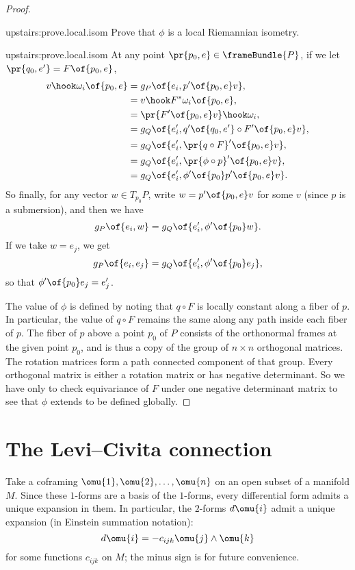 \begin{proof}
\begin{problem}{upstairs:prove.local.isom}
Prove that \(\phi\) is a local Riemannian isometry.
\end{problem}
\begin{answer}{upstairs:prove.local.isom}
At any point \(\pr{p_0,e} \in \frameBundle{P}\), if we let \(\pr{q_0,e'}=F\of{p_0,e}\),
\begin{align*}
v \hook \omega_i\of{p_0,e}
&=
g_P\of{e_i, p'\of{p_0,e}v},
\\
&=
v \hook F^* \omega_i \of{p_0,e},
\\
&=
\pr{F'\of{p_0,e}v} \hook \omega_i,
\\
&=
g_Q\of{e'_i,q'\of{q_0,e'} \circ F'\of{p_0,e}v},
\\
&=
g_Q\of{e'_i,\pr{q \circ F}'\of{p_0,e}v},
\\
&=
g_Q\of{e'_i,\pr{\phi \circ p}'\of{p_0,e}v},
\\
&=
g_Q\of{e'_i,\phi'\of{p_0} p'\of{p_0,e}v}.
\end{align*}
So finally, for any vector \(w \in T_{p_0} P\), write \(w=p'\of{p_0,e}v\) for some \(v\) (since \(p\) is a submersion), and then we have
\[
g_P\of{e_i,w}=g_Q\of{e_i',\phi'\of{p_0}w}.
\]
If we take \(w=e_j\), we get
\[
g_P\of{e_i,e_j}=g_Q\of{e_i',\phi'\of{p_0}e_j},
\]
so that \(\phi'\of{p_0}e_j = e_j'\).
\end{answer}
The value of \(\phi\) is defined by noting that \(q \circ F\) is locally constant along a fiber of \(p\).
In particular, the value of \(q \circ F\) remains the same along any path inside each fiber of \(p\).
The fiber of \(p\) above a point \(p_0\) of \(P\) consists of the orthonormal frames at the given point \(p_0\), and is thus a copy of the group of \(n \times n\) orthogonal matrices.
The rotation matrices form a path connected component of that group.
Every orthogonal matrix is either a rotation matrix or has negative determinant.
So we have only to check equivariance of \(F\) under one negative determinant matrix to see that \(\phi\) extends to be defined globally.
\end{proof}

\section{The Levi--Civita connection}
Take a coframing \(\omu{1}, \omu{2}, \dots, \omu{n}\) on an open subset of a manifold \(M\).
Since these \(1\)-forms are a basis of the \(1\)-forms, every differential form admits a unique expansion in them.
In particular, the \(2\)-forms \(d\omu{i}\) admit a unique expansion (in Einstein summation notation):
\[
d \omu{i} = -c_{ijk} \omu{j} \wedge \omu{k}
\]
for some functions \(c_{ijk}\) on \(M\); the minus sign is for future convenience.

